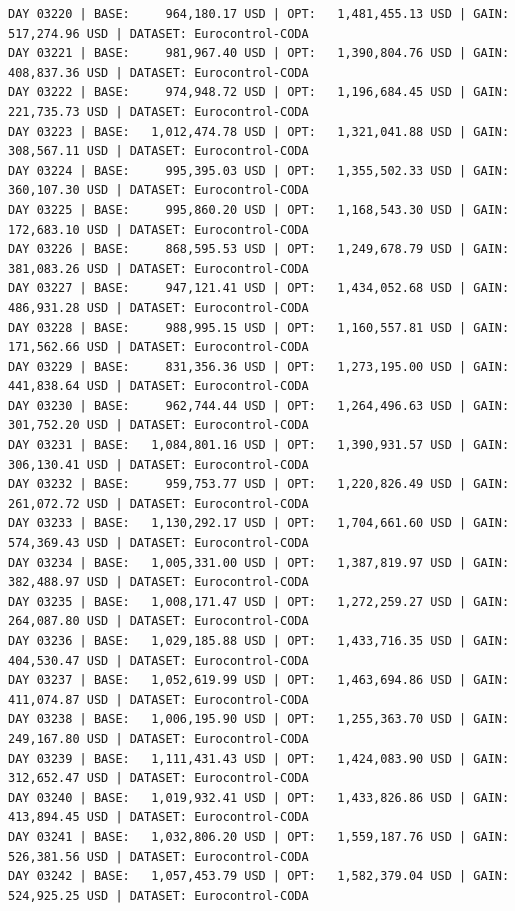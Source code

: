 \documentclass[11pt,a4paper]{article}
\begin{document}
\begin{verbatim}
DAY 03220 | BASE:     964,180.17 USD | OPT:   1,481,455.13 USD | GAIN: 517,274.96 USD | DATASET: Eurocontrol-CODA
DAY 03221 | BASE:     981,967.40 USD | OPT:   1,390,804.76 USD | GAIN: 408,837.36 USD | DATASET: Eurocontrol-CODA
DAY 03222 | BASE:     974,948.72 USD | OPT:   1,196,684.45 USD | GAIN: 221,735.73 USD | DATASET: Eurocontrol-CODA
DAY 03223 | BASE:   1,012,474.78 USD | OPT:   1,321,041.88 USD | GAIN: 308,567.11 USD | DATASET: Eurocontrol-CODA
DAY 03224 | BASE:     995,395.03 USD | OPT:   1,355,502.33 USD | GAIN: 360,107.30 USD | DATASET: Eurocontrol-CODA
DAY 03225 | BASE:     995,860.20 USD | OPT:   1,168,543.30 USD | GAIN: 172,683.10 USD | DATASET: Eurocontrol-CODA
DAY 03226 | BASE:     868,595.53 USD | OPT:   1,249,678.79 USD | GAIN: 381,083.26 USD | DATASET: Eurocontrol-CODA
DAY 03227 | BASE:     947,121.41 USD | OPT:   1,434,052.68 USD | GAIN: 486,931.28 USD | DATASET: Eurocontrol-CODA
DAY 03228 | BASE:     988,995.15 USD | OPT:   1,160,557.81 USD | GAIN: 171,562.66 USD | DATASET: Eurocontrol-CODA
DAY 03229 | BASE:     831,356.36 USD | OPT:   1,273,195.00 USD | GAIN: 441,838.64 USD | DATASET: Eurocontrol-CODA
DAY 03230 | BASE:     962,744.44 USD | OPT:   1,264,496.63 USD | GAIN: 301,752.20 USD | DATASET: Eurocontrol-CODA
DAY 03231 | BASE:   1,084,801.16 USD | OPT:   1,390,931.57 USD | GAIN: 306,130.41 USD | DATASET: Eurocontrol-CODA
DAY 03232 | BASE:     959,753.77 USD | OPT:   1,220,826.49 USD | GAIN: 261,072.72 USD | DATASET: Eurocontrol-CODA
DAY 03233 | BASE:   1,130,292.17 USD | OPT:   1,704,661.60 USD | GAIN: 574,369.43 USD | DATASET: Eurocontrol-CODA
DAY 03234 | BASE:   1,005,331.00 USD | OPT:   1,387,819.97 USD | GAIN: 382,488.97 USD | DATASET: Eurocontrol-CODA
DAY 03235 | BASE:   1,008,171.47 USD | OPT:   1,272,259.27 USD | GAIN: 264,087.80 USD | DATASET: Eurocontrol-CODA
DAY 03236 | BASE:   1,029,185.88 USD | OPT:   1,433,716.35 USD | GAIN: 404,530.47 USD | DATASET: Eurocontrol-CODA
DAY 03237 | BASE:   1,052,619.99 USD | OPT:   1,463,694.86 USD | GAIN: 411,074.87 USD | DATASET: Eurocontrol-CODA
DAY 03238 | BASE:   1,006,195.90 USD | OPT:   1,255,363.70 USD | GAIN: 249,167.80 USD | DATASET: Eurocontrol-CODA
DAY 03239 | BASE:   1,111,431.43 USD | OPT:   1,424,083.90 USD | GAIN: 312,652.47 USD | DATASET: Eurocontrol-CODA
DAY 03240 | BASE:   1,019,932.41 USD | OPT:   1,433,826.86 USD | GAIN: 413,894.45 USD | DATASET: Eurocontrol-CODA
DAY 03241 | BASE:   1,032,806.20 USD | OPT:   1,559,187.76 USD | GAIN: 526,381.56 USD | DATASET: Eurocontrol-CODA
DAY 03242 | BASE:   1,057,453.79 USD | OPT:   1,582,379.04 USD | GAIN: 524,925.25 USD | DATASET: Eurocontrol-CODA

\end{verbatim}
\end{document}
